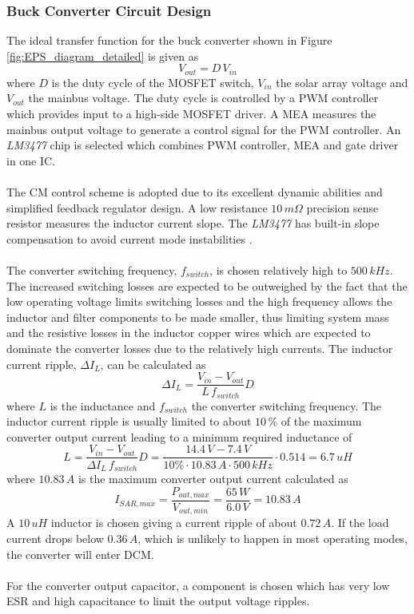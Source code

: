 \subsubsection{Buck Converter Circuit Design}
The ideal transfer function for the buck converter shown in Figure \ref{fig:EPS_diagram_detailed} is given as
%
\begin{equation}
V_{out}=D\,V_{in}
\end{equation}
%
where $D$ is the duty cycle of the \ac{MOSFET} switch, $V_{in}$ the solar array voltage and $V_{out}$ the mainbus voltage. The duty cycle is controlled by a \ac{PWM} controller which provides input to a high-side \ac{MOSFET} driver. A \ac{MEA} measures the mainbus output voltage to generate a control signal for the PWM controller. An \textit{LM3477} chip is selected which combines \ac{PWM} controller, \ac{MEA} and gate driver in one \ac{IC}.
\\
\\
The \ac{CM} control scheme is adopted due to its excellent dynamic abilities \cite[sec. 12-3-6]{Fundamentals} and simplified feedback regulator design. A low resistance $10\,m \Omega$ precision sense resistor measures the inductor current slope. The \textit{LM3477} has built-in slope compensation to avoid current mode instabilities \cite[sec. 12-1]{Fundamentals}.
\\
\\
The converter switching frequency, $f_{switch}$, is chosen relatively high to $500\,kHz$. The increased switching losses are expected to be outweighed by the fact that the low operating voltage limits switching losses and the high frequency allows the inductor and filter components to be made smaller, thus limiting system mass and the resistive losses in the inductor copper wires which are expected to dominate the converter losses due to the relatively high currents. The inductor current ripple, $\Delta I_L$, can be calculated as 
%
\begin{equation}
\Delta I_L=\dfrac{V_{in}-V_{out}}{L\,f_{switch}}D
\end{equation}
%
where $L$ is the inductance and $f_{switch}$ the converter switching frequency. 
The inductor current ripple is usually limited to about $10\,\%$ of the maximum converter output current leading to a minimum required inductance of
%
\begin{equation}
L=\dfrac{V_{in}-V_{out}}{\Delta I_L\,f_{switch}}D=\dfrac{14.4\,V-7.4\,V}{10\% \cdot 10.83\,A\cdot 500\,kHz}\cdot 0.514=6.7\,uH
\end{equation}
%
where $10.83\,A$ is the maximum converter output current calculated as 
%
\begin{equation}
I_{SAR,max}=\dfrac{P_{out,max}}{V_{out,min}}=\dfrac{65\,W}{6.0\,V}=10.83\,A
\end{equation}
%
A $10\,uH$ inductor is chosen giving a current ripple of about $0.72\,A$. If the load current drops below $0.36\,A$, which is unlikely to happen in most operating modes, the converter will enter \ac{DCM}.
\\
\\
For the converter output capacitor, a component is chosen which has very low \ac{ESR} and high capacitance to limit the output voltage ripples.
%
